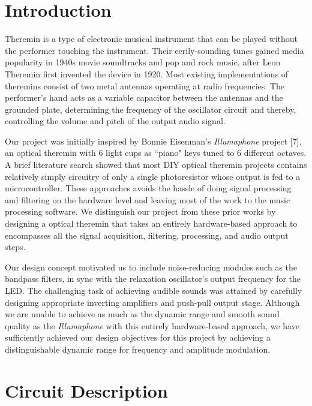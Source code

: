 \documentclass[twocolumn]{article}
\begin{document}
\section{Introduction}
Theremin is a type of electronic musical instrument that can be played without the performer touching the instrument. Their eerily-sounding tunes gained media popularity in 1940s movie soundtracks and pop and rock music, after Leon Theremin first invented the device in 1920. Most existing implementations of theremins consist of two metal antennas operating at radio frequencies. The performer's hand acts as a variable capacitor between the antennas and the grounded plate, determining the frequency of the oscillator circuit and thereby, controlling the volume and pitch of the output audio signal.
\par Our project was initially inspired by  Bonnie Eisenman's \textit{Illumaphone} project {\footnotesize[7]}, an optical theremin with 6 light cups as ``piano" keys tuned to 6 different octaves.  A brief literature search showed that most DIY optical theremin projects contains relatively simply circuitry of only a single photoresistor whose output is fed to a microcontroller. These approaches avoids the hassle of doing signal processing and filtering on the hardware level and leaving most of the work to the music processing software. We distinguish our project from these prior works by designing a optical theremin that takes an entirely hardware-based approach to encompasses all the signal acquisition, filtering, processing, and audio output steps. 
\par Our design concept motivated us to include noise-reducing modules such as the bandpass filters, in sync with the relaxation oscillator's output frequency for the LED. The challenging task of achieving audible sounds was attained by carefully designing appropriate inverting amplifiers and push-pull output stage. %
Although we are unable to achieve as much as the dynamic range and smooth sound quality as the \textit{Illumaphone} with this entirely hardware-based approach, we have  sufficiently achieved our design objectives for this project by achieving a distinguishable dynamic range for frequency and amplitude modulation.
\section{Circuit Description}
\end{document}
